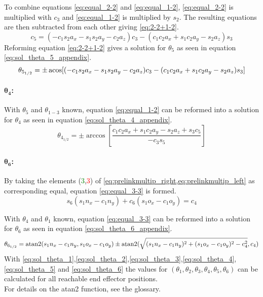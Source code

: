 To combine equations \ref{eq:equal_2-2} and \ref{eq:equal_1-2}, \ref{eq:equal_2-2} is multiplied with $c_3$ and  \ref{eq:equal_1-2} is multiplied by $ s_2$. The resulting equations are then subtracted from each other giving \ref{eq:2-2+1-2}.
\begin{equation}\label{eq:2-2+1-2}
c_5 = (-c_1 s_2 a_x - s_1 s_2 a_y -c_2 a_z) c_3 - (c_1 c_2 a_x +s_1 c_2 a_y - s_2 a_z) s_3
\end{equation}
Reforming equation \ref{eq:2-2+1-2} gives a solution for $\theta_5$ as seen in equation \ref{eq:sol_theta_5_appendix}.
\begin{equation}\label{eq:sol_theta_5_appendix}
\theta_{5_{1/2}} = \pm \operatorname{acos} [ ( -c_1 s_2 a_x - s_1 s_2 a_y - c_2 a_z) c_3 - (c_1 c_2 a_x + s_1 c_2 a_y - s_2 a_z) s_3]
\end{equation}

\paragraph{$\pmb{\theta_4}$:}

With $\theta_5$ and $\theta_{1-3}$ known, equation \ref{eq:equal_1-2} can be reformed into a solution for $\theta_4$ as seen in equation \ref{eq:sol_theta_4_appendix}.
\begin{equation}\label{eq:sol_theta_4_appendix}
\theta_{4_{1/2}} = \pm \arccos [ \frac{ c_1 c_2 a_x + s_1 c_2 a_y - s_2 a_z + s_3 c_5}{-c_3 s_5}]
\end{equation}

\paragraph{$\pmb{\theta_6}$:}
By taking the elements (\textcolor{green}{3},\textcolor{red}{3}) of \cref{eq:prelinkmultip_right,eq:prelinkmultip_left} as corresponding equal, equation \ref{eq:equal_3-3} is formed.
\begin{equation} \label{eq:equal_3-3}
s_6 (s_1 n_x - c_1 n_y) + c_6 (s_1 o_x - c_1 o_y ) = c_4
\end{equation}

With $\theta_4$ and $\theta_1$ known, equation \ref{eq:equal_3-3} can be reformed into a solution for $\theta_6$ as seen in equation \ref{eq:sol_theta_6_appendix}.
\begin{equation}\label{eq:sol_theta_6_appendix}
\theta_{6_{1/2}} = \operatorname{atan2}(s_1 n_x -c_1 n_y , s_1 o_x -c_1 o_y) \pm \operatorname{atan2}(\sqrt{(s_1 n_x - c_1 n_y)^2 + (s_1 o_x - c_1 o_y )^2 - c_4^2} , c_4)
\end{equation}
\medskip
With \ref{eq:sol_theta_1},\ref{eq:sol_theta_2},\ref{eq:sol_theta_3},\ref{eq:sol_theta_4},\ref{eq:sol_theta_5} and \ref{eq:sol_theta_6} the values for $(\theta_1, \theta_2, \theta_3, \theta_4, \theta_5, \theta_6)$ can be calculated for all reachable end effector positions.\\

For details on the \gls{atan2} function, see the glossary.
\medskip